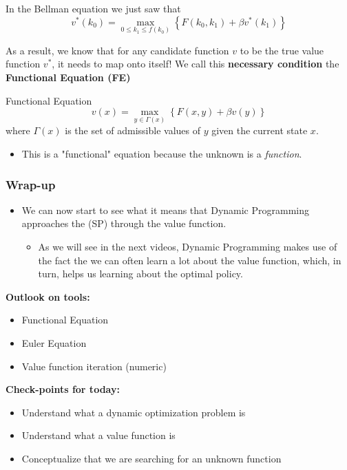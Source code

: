 \documentclass[aspectratio=169]{beamer}
\begin{document}
\begin{frame}
In the Bellman equation we just saw that 
\begin{equation*}
v^*(k_0) = \max_{0 \leq k_{1} \leq f(k_0)} \left\lbrace F(k_0, k_1) + \beta v^*(k_1) \right\rbrace
\end{equation*}

As a result, we know that for any candidate function $v$ to be the true value function $v^*$, it needs to map onto itself! We call this \color{blue}\textbf{necessary condition} \color{black} the \textbf{Functional Equation (FE)}

\begin{block}{Functional Equation}
\begin{equation}
v(x) = \max_{y \in \Gamma(x)} \left\lbrace F(x, y) + \beta v(y) \right\rbrace \tag{FE}
\end{equation}
where $\Gamma(x)$ is the set of admissible values of $y$ given the current state $x$.
\end{block}
\begin{itemize}
\item This is a "functional" equation because the unknown is a \textit{function}.
\end{itemize}
\end{frame}

\begin{frame}
\frametitle{Wrap-up}
\begin{itemize}
\item We can now start to see what it means that Dynamic Programming approaches the (SP) through the value function. 
\begin{itemize}
\item As we will see in the next videos, Dynamic Programming makes use of the fact the we can often learn a lot about the value function, which, in turn, helps us learning about the optimal policy.
\end{itemize}
\end{itemize}
\medskip

\textbf{Outlook on tools:}
\begin{itemize}
\item Functional Equation
\item Euler Equation
\item Value function iteration (numeric)
\end{itemize}
\end{frame}

\begin{frame}
\textbf{Check-points for today:}
\begin{itemize}
\item Understand what a dynamic optimization problem is
\item Understand what a value function is
\item Conceptualize that we are searching for an unknown function
\end{itemize}
\end{frame}
\end{document}
